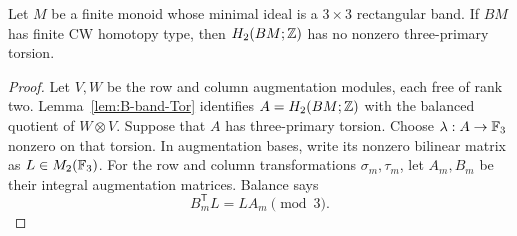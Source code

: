 \begin{theorem}
\label{B:three-by-three-no-three}
Let $M$ be a finite monoid whose minimal ideal is a $3\times3$
rectangular band. If $BM$ has finite CW homotopy type, then
$H_2(BM;\mathbb Z)$ has no nonzero three-primary torsion.
\end{theorem}
\begin{proof}
Let $V,W$ be the row and column augmentation modules, each free
of rank two. Lemma~\ref{lem:B-band-Tor} identifies
$A=H_2(BM;\mathbb Z)$ with the balanced quotient of $W\otimes V$.
Suppose that $A$ has three-primary torsion. Choose
$\lambda:A\to\mathbb F_3$ nonzero on that torsion. In augmentation
bases, write its nonzero bilinear matrix as $L\in M_2(\mathbb F_3)$.
For the row and column transformations $\sigma_m,\tau_m$, let
$A_m,B_m$ be their integral augmentation matrices. Balance says
\begin{equation}\label{B:three-balance}
 B_m^{\mathsf T}L=LA_m\pmod3.
\end{equation}


\end{proof}
